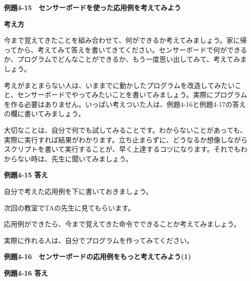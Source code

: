 \documentclass[a4paper,dvipdfmx]{jarticle}
\newcommand\textstyleqwerty[1]{#1}
\begin{document}
\bigskip


\bigskip


\bigskip


\bigskip


\bigskip


\bigskip

\clearpage
\textstyleqwerty{\textbf{例題4-15　センサーボードを使った応用例を考えてみよう}}


\bigskip

{\bfseries
考え方}


\bigskip

今まで覚えてきたことを組み合わせて、何ができるか考えてみましょう。家に帰ってから、考えてみて答えを書いてきてください。センサーボードで何ができるか、プログラムでどんなことができるか、もう一度思い出してみて、考えてみましょう。

考えがまとまらない人は、いままでに動かしたプログラムを改造してみたいこと、センサーボードでやってみたいことを書いてみましょう。実際にプログラムを作る必要はありません。いっぱい考えついた人は、例題4-16と例題4-17の答えの欄に書いてみましょう。


\bigskip

大切なことは、自分で何でも試してみることです。わからないことがあっても、実際に実行すれば結果がわかります。立ち止まらずに、どうなるか想像しながらスクリプトを書いて実行することが、早く上達するコツになります。それでもわからない時は、先生に聞いてみましょう。


\bigskip

{\bfseries
例題4-15 答え}


\bigskip

自分で考えた応用例を下に書いておきましょう。

次回の教室でTAの先生に見てもらいます。

応用例ができたら、今まで覚えてきた命令でできることか考えてみましょう。

実際に作れる人は、自分でプログラムを作ってみてください。


\bigskip


\bigskip


\bigskip


\bigskip


\bigskip


\bigskip

\textstyleqwerty{\textbf{例題4-16　センサーボードの応用例をもっと考えてみよう(1)}}

{\bfseries
例題4-16 答え}


\bigskip


\bigskip
\end{document}
